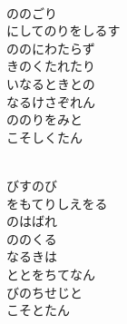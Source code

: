 \documentclass[10pt,b5j]{tarticle} %
\begin{document}
\vspace{1.5em} %
\newcommand{\linespace}{0.5em} %
\newcommand{\blocksize}{0.5\hsize} %
\newcommand{\itemmargin}{6em} %
\begin{enumerate} %
    \setlength{\itemindent}{\itemmargin} %
    \begin{minipage}[c]{\blocksize}
    
        \vspace{\linespace}
        \item~\\
        ののごり\\
        にしてのりをしるす\\
        ののにわたらず\\
        きのくたれたり\\
        いなるときとの\\
        なるけさぞれん\\
        ののりをみと\\
        こそしくたん
        
        \vspace{\linespace}
        \item~\\
        びすのび\\
        をもてりしえをる\\
        のはばれ\\
        ののくる\\
        なるきは\\
        ととをちてなん\\
        びのちせじと\\
        こそとたん
        

\end{minipage}
\end{enumerate}
\end{document}
